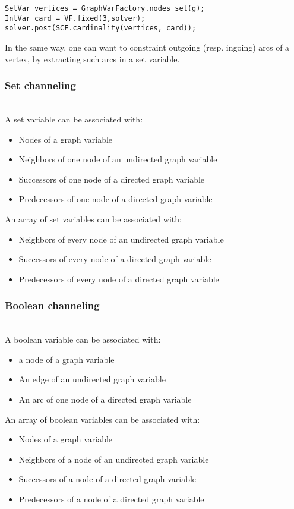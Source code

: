 \documentclass{article}
\begin{document}
\begin{lstlisting}
SetVar vertices = GraphVarFactory.nodes_set(g);
IntVar card = VF.fixed(3,solver);
solver.post(SCF.cardinality(vertices, card));
\end{lstlisting}

In the same way, one can want to constraint outgoing (resp. ingoing) arcs of a vertex, by extracting such arcs in a set variable. 

\subsubsection{Set channeling}~\\

A set variable can be associated with: 
\begin{itemize}
\item Nodes of a graph variable
\item Neighbors of one node of an undirected graph variable
\item Successors of one node of a directed graph variable
\item Predecessors of one node of a directed graph variable
\end{itemize}

An array of set variables can be associated with: 
\begin{itemize}
\item Neighbors of every node of an undirected graph variable
\item Successors of every node of a directed graph variable
\item Predecessors of every node of a directed graph variable
\end{itemize}

\subsubsection{Boolean channeling}~\\

A boolean variable can be associated with: 
\begin{itemize}
\item a node of a graph variable
\item An edge of an undirected graph variable
\item An arc of one node of a directed graph variable
\end{itemize}

An array of boolean variables can be associated with: 
\begin{itemize}
\item Nodes of a graph variable
\item Neighbors of a node of an undirected graph variable
\item Successors of a node of a directed graph variable
\item Predecessors of a node of a directed graph variable
\end{itemize}
\end{document}
